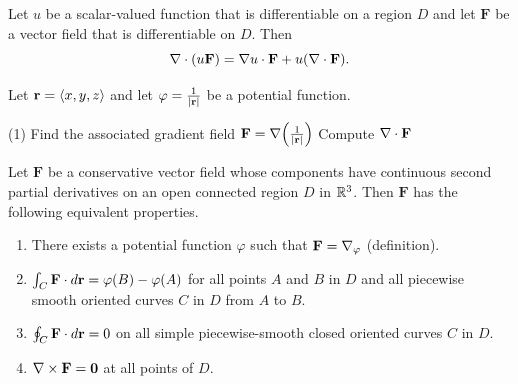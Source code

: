 \documentclass[mathNotesPreamble]{subfiles}
\begin{document}
  \begin{thmBox*}
    Let $u$ be a scalar-valued function that is differentiable on a region $D$ and let $\mathbf F$ be a vector field that is differentiable on $D$. Then
      \[\nabla\cdot{\left(u\mathbf F\right)}=\nabla u\cdot\mathbf F+u{\left(\nabla\cdot\mathbf F\right)}.\]
  \end{thmBox*}
  \begin{ex*}
    Let ${\mathbf{r}}={\left\langle x,y,z \right\rangle}$ and let $\varphi=\frac{1}{{\left\vert{\mathbf{r}}\right\vert}}$ be a potential function.
  \end{ex*}
  \begin{tasks}[after-item-skip=\stretch{1}, label=](1)
    \task 
      Find the associated gradient field $\mathbf F=\nabla{\left(\frac{1}{{\left\vert{\mathbf{r}}\right\vert}}\right)}$
    \task 
      Compute $\nabla\cdot\mathbf F$
  \end{tasks}
  \pagebreak

  \begin{thmBox*}
    Let $\mathbf F$ be a conservative vector field whose components have continuous second partial derivatives on an open connected region $D$ in $\mathbb{R}^3$. Then $\mathbf F$ has the following equivalent properties.
    \begin{enumerate}
      \item 
        There exists a potential function $\varphi$ such that $\mathbf F=\nabla_\varphi$ (definition).
      \item 
        $\int_C \mathbf F\cdot d{\mathbf{r}}=\varphi(B)-\varphi(A)$ for all points $A$ and $B$ in $D$ and all piecewise smooth oriented curves $C$ in $D$ from $A$ to $B$.
      \item 
        $\oint_C \mathbf F\cdot d{\mathbf{r}}=0$ on all simple piecewise-smooth closed oriented curves $C$ in $D$.
      \item 
        $\nabla\times\mathbf F=\mathbf{0}$ at all points of $D$.
    \end{enumerate}
  \end{thmBox*}

  \pagebreak
  
\end{document}
